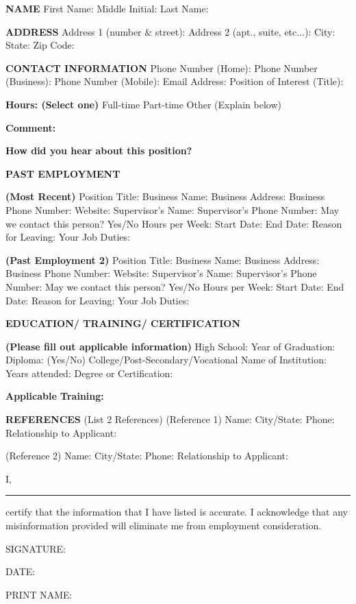 \textbf{NAME}
\break First Name:
\break Middle Initial:
\break Last Name:

\textbf{ADDRESS}
\break Address 1 (number \& street):
\break Address 2 (apt., suite, etc...):
\break City:
\break State:
\break Zip Code:

\textbf{CONTACT INFORMATION}
\break Phone Number (Home):
\break Phone Number (Business):
\break Phone Number (Mobile):
\break Email Address:
\break Position of Interest (Title):

\textbf{Hours: (Select one)} 
\break Full-time
\break Part-time
\break Other (Explain below)

\textbf{Comment:}

\textbf{How did you hear about this position?}

\textbf{PAST EMPLOYMENT}

\textbf{(Most Recent)}
\break Position Title: 
\break Business Name: 
\break Business Address:
\break Business Phone Number:
\break Website:
\break Supervisor's Name:
\break Supervisor's Phone Number:
\break May we contact this person? Yes/No 
\break Hours per Week:
\break Start Date:
\break End Date:
\break Reason for Leaving:
\break Your Job Duties:

\textbf{(Past Employment 2)} 
\break Position Title: 
\break Business Name: 
\break Business Address:
\break Business Phone Number:
\break Website:
\break Supervisor's Name:
\break Supervisor's Phone Number:
\break May we contact this person? Yes/No 
\break Hours per Week:
\break Start Date:
\break End Date:
\break Reason for Leaving:
\break Your Job Duties:

\textbf{EDUCATION/ TRAINING/ CERTIFICATION}

\textbf{(Please fill out applicable information) }
\break High School:
\break Year of Graduation:
\break Diploma: (Yes/No)
\break College/Post-Secondary/Vocational
\break Name of Institution:
\break Years attended:
\break Degree or Certification:

\textbf{Applicable Training:}



\textbf{REFERENCES}
(List 2 References)
(Reference 1)
\break Name:
\break City/State:
\break Phone:
\break Relationship to Applicant:

(Reference 2) 
\break Name:
\break City/State:
\break Phone:
\break Relationship to Applicant:

\break I, \rule{2cm}{1pt} certify that the information that I have listed is accurate. I acknowledge that any misinformation provided will eliminate me from employment consideration.

SIGNATURE: 	 

DATE: 	

PRINT NAME: 	

